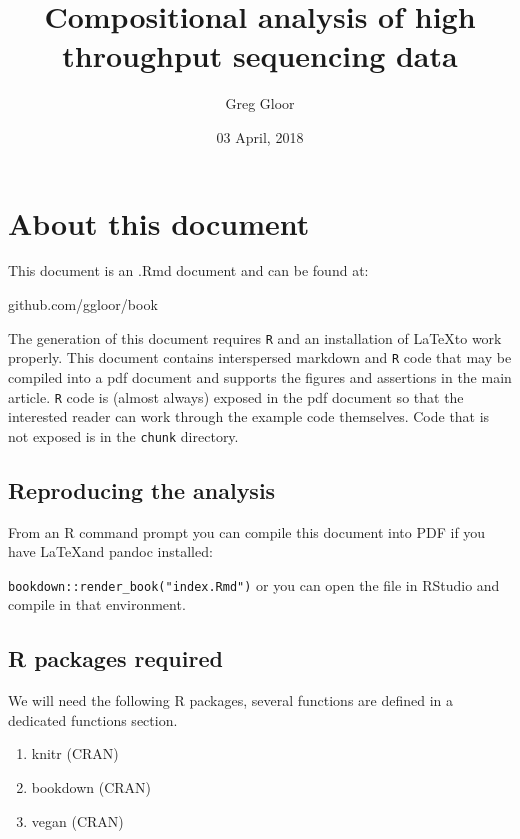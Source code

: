 \documentclass[onecolumn]{book}
\title{Compositional analysis of high throughput sequencing data}
\author{Greg Gloor}
\date{03 April, 2018}
\providecommand{\tightlist}{%
  \setlength{\itemsep}{0pt}\setlength{\parskip}{0pt}}
\theoremstyle{definition}
\theoremstyle{definition}
\theoremstyle{definition}
\theoremstyle{remark}
\begin{document}
\maketitle

{
\setcounter{tocdepth}{2}
\tableofcontents
}
\hypertarget{about}{%
\chapter{About this document}\label{about}}

This document is an .Rmd document and can be found at:

github.com/ggloor/book

The generation of this document requires \texttt{R} and an installation
of \LaTeX to work properly. This document contains interspersed markdown
and \texttt{R} code that may be compiled into a pdf document and
supports the figures and assertions in the main article. \texttt{R} code
is (almost always) exposed in the pdf document so that the interested
reader can work through the example code themselves. Code that is not
exposed is in the \texttt{chunk} directory.

\hypertarget{reproducing-the-analysis}{%
\section{Reproducing the analysis}\label{reproducing-the-analysis}}

From an R command prompt you can compile this document into PDF if you
have \LaTeX and pandoc installed:

\texttt{bookdown::render\_book("index.Rmd")} or you can open the file in
RStudio and compile in that environment.

\hypertarget{r-packages-required}{%
\section{R packages required}\label{r-packages-required}}

We will need the following R packages, several functions are defined in
a dedicated functions section.

\begin{enumerate}
\def\labelenumi{\arabic{enumi}.}
\tightlist
\item
  knitr (CRAN)
\item
  bookdown (CRAN)
\item
  vegan (CRAN)
\end{enumerate}
\end{document}
